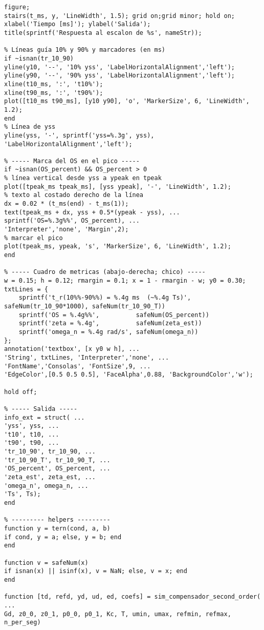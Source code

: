 \begin{lstlisting}[style=matlabstyle,caption={Funciones reutilizadas de laboratorios pasados.},label={matlab:oldfunc}]
% ----- Grafico -----
figure;
stairs(t_ms, y, 'LineWidth', 1.5); grid on;grid minor; hold on;
xlabel('Tiempo [ms]'); ylabel('Salida');
title(sprintf('Respuesta al escalon de %s', nameStr));

% Líneas guía 10% y 90% y marcadores (en ms)
if ~isnan(tr_10_90)
yline(y10, '--', '10% yss', 'LabelHorizontalAlignment','left');
yline(y90, '--', '90% yss', 'LabelHorizontalAlignment','left');
xline(t10_ms, ':', 't10%');
xline(t90_ms, ':', 't90%');
plot([t10_ms t90_ms], [y10 y90], 'o', 'MarkerSize', 6, 'LineWidth', 1.2);
end
% Línea de yss
yline(yss, '-', sprintf('yss=%.3g', yss), 'LabelHorizontalAlignment','left');

% ----- Marca del OS en el pico -----
if ~isnan(OS_percent) && OS_percent > 0
% línea vertical desde yss a ypeak en tpeak
plot([tpeak_ms tpeak_ms], [yss ypeak], '-', 'LineWidth', 1.2);
% texto al costado derecho de la línea
dx = 0.02 * (t_ms(end) - t_ms(1));
text(tpeak_ms + dx, yss + 0.5*(ypeak - yss), ...
sprintf('OS=%.3g%%', OS_percent), ...
'Interpreter','none', 'Margin',2);
% marcar el pico
plot(tpeak_ms, ypeak, 's', 'MarkerSize', 6, 'LineWidth', 1.2);
end

% ----- Cuadro de metricas (abajo-derecha; chico) -----
w = 0.15; h = 0.12; rmargin = 0.1; x = 1 - rmargin - w; y0 = 0.30;
txtLines = {
	sprintf('t_r(10%%-90%%) = %.4g ms  (~%.4g Ts)', safeNum(tr_10_90*1000), safeNum(tr_10_90_T))
	sprintf('OS = %.4g%%',          safeNum(OS_percent))
	sprintf('zeta = %.4g',          safeNum(zeta_est))
	sprintf('omega_n = %.4g rad/s', safeNum(omega_n))
};
annotation('textbox', [x y0 w h], ...
'String', txtLines, 'Interpreter','none', ...
'FontName','Consolas', 'FontSize',9, ...
'EdgeColor',[0.5 0.5 0.5], 'FaceAlpha',0.88, 'BackgroundColor','w');

hold off;

% ----- Salida -----
info_ext = struct( ...
'yss', yss, ...
't10', t10, ...
't90', t90, ...
'tr_10_90', tr_10_90, ...
'tr_10_90_T', tr_10_90_T, ...
'OS_percent', OS_percent, ...
'zeta_est', zeta_est, ...
'omega_n', omega_n, ...
'Ts', Ts);
end

% --------- helpers ---------
function y = tern(cond, a, b)
if cond, y = a; else, y = b; end
end

function v = safeNum(x)
if isnan(x) || isinf(x), v = NaN; else, v = x; end
end

function [td, refd, yd, ud, ed, coefs] = sim_compensador_second_order( ...
Gd, z0_0, z0_1, p0_0, p0_1, Kc, T, umin, umax, refmin, refmax, n_per_seg)


\end{lstlisting}
